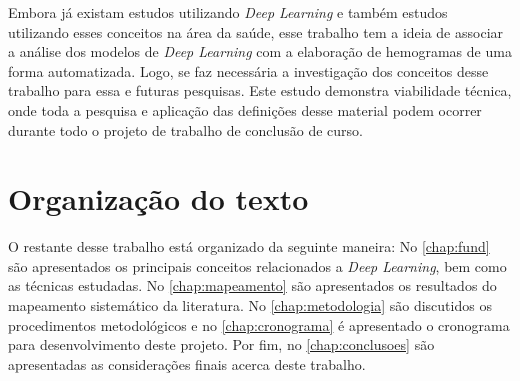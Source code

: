 Embora já existam estudos utilizando \emph{Deep Learning} e também estudos utilizando esses conceitos na área da saúde, esse trabalho tem a ideia de associar a análise dos modelos de \emph{Deep Learning} com a elaboração de hemogramas de uma forma automatizada. Logo, se faz necessária a investigação dos conceitos desse trabalho para essa e futuras pesquisas. Este estudo demonstra viabilidade técnica, onde toda a pesquisa e aplicação das definições desse material podem ocorrer durante todo o projeto de trabalho de conclusão de curso.

\section{Organização do texto}
\label{sec:organizacao}
O restante desse trabalho está organizado da seguinte maneira: No \autoref{chap:fund} são apresentados os principais conceitos relacionados a \emph{Deep Learning}, bem como as técnicas estudadas. No \autoref{chap:mapeamento} são apresentados os resultados do mapeamento sistemático da literatura. No \autoref{chap:metodologia} são discutidos os procedimentos metodológicos e no \autoref{chap:cronograma} é apresentado o cronograma para desenvolvimento deste projeto. Por fim, no \autoref{chap:conclusoes} são apresentadas as considerações finais acerca deste trabalho.
